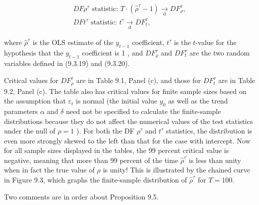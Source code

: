 \documentclass[10pt]{article}
\begin{document}
\begin{gather*}
D F \rho^{\tau} \text { statistic: } T \cdot\left(\hat{\rho}^{\tau}-1\right) \underset{\mathrm{d}}{\rightarrow} D F_{\rho}^{\tau},  \tag{9.3.21}\\
D F t^{\tau} \text { statistic: } t^{\tau} \underset{\mathrm{d}}{\rightarrow} D F_{t}^{\tau}, \tag{9.3.22}
\end{gather*}


where $\hat{\rho}^{\tau}$ is the OLS estimate of the $y_{t-1}$ coefficient, $t^{\tau}$ is the $t$-value for the hypothesis that the $y_{t-1}$ coefficient is 1 , and $D F_{\rho}^{\tau}$ and $D F_{t}^{\tau}$ are the two random variables defined in (9.3.19) and (9.3.20).

Critical values for $D F_{\rho}^{\tau}$ are in Table 9.1, Panel (c), and those for $D F_{t}^{\tau}$ are in Table 9.2, Panel (c). The table also has critical values for finite sample sizes based on the assumption that $\varepsilon_{t}$ is normal (the initial value $y_{0}$ as well as the trend parameters $\alpha$ and $\delta$ need not be specified to calculate the finite-sample distributions because they do not affect the numerical values of the test statistics under the null of $\rho=1$ ). For both the DF $\rho^{\tau}$ and $t^{\tau}$ statistics, the distribution is even more strongly skewed to the left than that for the case with intercept. Now for all sample sizes displayed in the tables, the 99 percent critical value is negative, meaning that more than 99 percent of the time $\hat{\rho}^{\tau}$ is less than unity when in fact the true value of $\rho$ is unity! This is illustrated by the chained curve in Figure 9.3, which graphs the finite-sample distribution of $\hat{\rho}^{\tau}$ for $T=100$.

Two comments are in order about Proposition 9.5.
\end{document}
